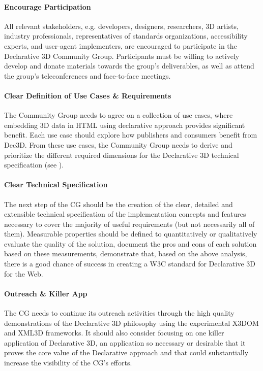 \documentclass[review]{acmsiggraph}
\begin{document}
\paragraph{Encourage Participation}
All relevant stakeholders, e.g. developers, designers, researchers, 3D artists, industry professionals, representatives of standards organizations, accessibility experts, and user-agent implementers, are encouraged to participate in the Declarative 3D Community Group. Participants must be willing to actively develop and donate materials towards the group's deliverables, as well as attend the group's teleconferences and face-to-face meetings.

\paragraph{Clear Definition of Use Cases \& Requirements}
The Community Group needs to agree on a collection of use cases, where embedding 3D data in HTML using declarative approach provides significant benefit. Each use case should explore how publishers and consumers benefit from Dec3D. From these use cases, the Community Group needs to derive and prioritize the different required dimensions for the Declarative 3D technical specification (see \cite{JankowskiDec3D2012,LeFeuvreDec3D2012}).

\paragraph{Clear Technical Specification}
The next step of the CG should be the creation of the clear, detailed and extensible technical specification of the implementation concepts and features necessary to cover the majority of useful requirements (but not necessarily all of them). Measurable properties should be defined to quantitatively or qualitatively evaluate the quality of the solution, document the pros and cons of each solution based on these measurements, demonstrate that, based on the above analysis, there is a good chance of success in creating a W3C standard for Declarative 3D for the Web.

\paragraph{Outreach \& Killer App}
The CG needs to continue its outreach activities through the high quality demonstrations of the Declarative 3D philosophy using the experimental X3DOM and XML3D frameworks. It should also consider focusing on one killer application of Declarative 3D, an application so necessary or desirable that it proves the core value of the Declarative approach and that could substantially increase the visibility of the CG's efforts.
\end{document}
